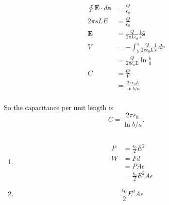 \documentclass{article}
\renewcommand{\vec}[1]{\boldsymbol{\mathbf{#1}}}
\newcommand{\uvec}[1]{\hat{\vec{#1}}}
\begin{document}
\begin{align*}
  \oint \vec{E} \cdot d \vec{a} & = \frac{Q}{\epsilon_0}                                     \\
  2 \pi s L E                   & = \frac{Q}{\epsilon_0}                                     \\
  \vec{E}                       & = \frac{Q}{2 \pi L \epsilon_0} \frac{1}{s} \uvec{s}        \\
  V                             & = -\int_b^a \frac{Q}{2 \pi \epsilon_0 L} \frac{1}{s} \,d r \\
                                & = \frac{Q}{2 \pi \epsilon_0 L} \ln \frac{b}{a}             \\
  C                             & = \frac{Q}{V}                                              \\
                                & = \frac{2 \pi \epsilon_0 L}{\ln b / a}                     \\
\end{align*}

So the capacitance per unit length is \[C = \frac{2 \pi \epsilon_0}{\ln b / a}.\]

\subsection{}

\begin{enumerate}
  \item

        \begin{align*}
          P & = \frac{\epsilon_0}{2} E^2            \\
          W & = F d                                 \\
            & = P A \epsilon                        \\
            & = \frac{\epsilon_0}{2} E^2 A \epsilon
        \end{align*}

  \item \[\frac{\epsilon_0}{2} E^2 A \epsilon\]
\end{enumerate}

\setcounter{subsection}{45}
\subsection{}
\end{document}
